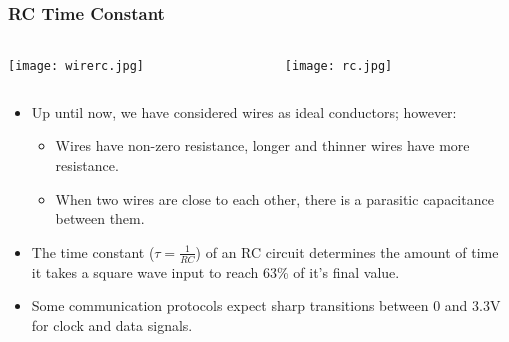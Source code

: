 \documentclass{beamer}
\begin{document}
\begin{frame}\frametitle{RC Time Constant}
\begin{columns}
\begin{column}{5cm}
\begin{center}
\texttt{[image: wirerc.jpg]}
\end{center}
\end{column}
\begin{column}{5cm}
\begin{center}
\texttt{[image: rc.jpg]}
\end{center}
\end{column}
\end{columns}
\begin{itemize}
\item Up until now, we have considered wires as ideal conductors; however:
\begin{itemize}
\item Wires have non-zero resistance, longer and thinner wires have more resistance.
\item When two wires are close to each other, there is a parasitic capacitance between them.
\end{itemize}
\item The time constant ($\tau = \frac{1}{RC}$) of an RC circuit determines the amount of time it takes a square wave input to reach 63\% of it's final value.
\item Some communication protocols expect sharp transitions between 0 and 3.3V for clock and data signals. 
\end{itemize}
\end{frame}
\end{document}
